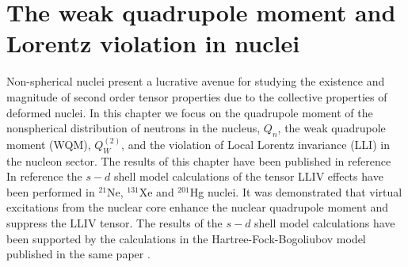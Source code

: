 \documentclass[10pt,a4paper, twoside, openright]{report}
\begin{document}
\chapter{The weak quadrupole moment and Lorentz violation in nuclei} \label{chap:WQM}
Non-spherical nuclei present a lucrative avenue for studying the existence and magnitude of second order tensor properties due to the collective properties of deformed nuclei. In this chapter we focus on the quadrupole moment of the nonspherical  distribution of neutrons in the nucleus, $Q_{n}$,  the weak quadrupole moment (WQM), $Q_{W}^{(2)}$,  and the violation of Local Lorentz invariance (LLI) in the nucleon sector. The results of this chapter have been published in reference \cite{LFWQM2018} \\
\linebreak
In reference \cite{Brown2016} the $s-d$ shell model calculations of the tensor LLIV effects have been performed in $^{21}$Ne, $^{131}$Xe and $^{201}$Hg nuclei. It was demonstrated that virtual excitations from the nuclear core enhance the nuclear quadrupole moment and suppress the LLIV tensor.  The results of the $s-d$ shell model calculations have been supported by the calculations in the Hartree-Fock-Bogoliubov model published in the same paper \cite{Brown2016}.
\end{document}
